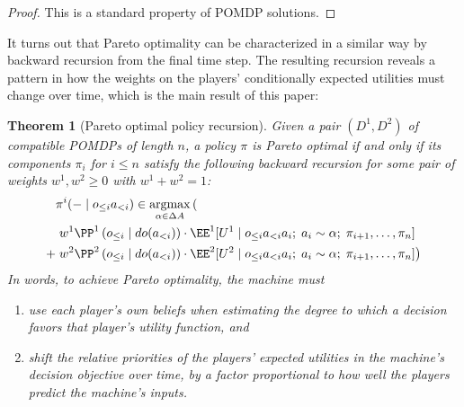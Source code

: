 \documentclass{article}  %
\newcommand{\hist}[1]{o_{\le #1}a_{<#1}}
\newcommand{\dohist}[1]{o_{\le #1} \mid do(a_{<#1})}
\DeclareMathOperator*{\argmax}{argmax}
\newtheorem{theorem}{Theorem}
\begin{document}
\begin{proof}
This is a standard property of POMDP solutions.
\end{proof}

It turns out that Pareto optimality can be characterized in a similar way by backward recursion from the final time step.  The resulting recursion reveals a pattern in how the weights on the players' conditionally expected utilities must change over time, which is the main result of this paper:

\begin{theorem}[Pareto optimal policy recursion]\label{thm:main}
Given a pair $(D^1,D^2)$ of compatible POMDPs of length $n$, a policy $\pi$ is Pareto optimal if and only if its components $\pi_i$ for $i\le n$ satisfy the following backward recursion for some pair of weights $w^1,w^2\geq 0$ with $w^1+w^2=1$:
\begin{align*}
&\pi^i(-\mid\hist{i}) \in \argmax_{\alpha\in\Delta A} \left(\vphantom{\left(\left(\right)\right)}\right.\\
& \left.w^1 \PP^1\left(\dohist{i}\right)\cdot \EE^1[U^1 \mid \hist{i} a_i ;\; a_i\sim \alpha;\; \pi_{i+1},\ldots,\pi_n]\right.\\
+ & \left.w^2 \PP^2\left(\dohist{i}\right)\cdot \EE^2[U^2 \mid \hist{i} a_i;\; a_i\sim \alpha;\; \pi_{i+1},\ldots,\pi_n] \right)
\end{align*}
In words, to achieve Pareto optimality, the machine must
\begin{enumerate}
\item use each player's own beliefs when estimating the degree to which a decision favors that player's utility function, and
\item shift the relative priorities of the players' expected utilities in the machine's decision objective over time, by a factor proportional to how well the players predict the machine's inputs.
\end{enumerate}
\end{theorem}
\end{document}

